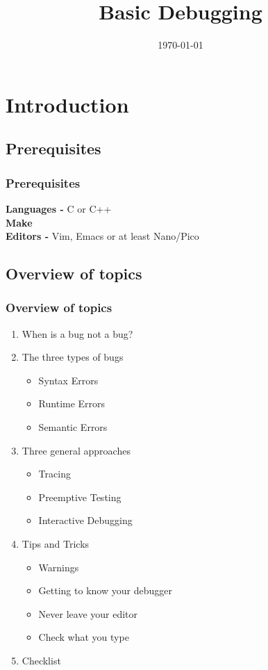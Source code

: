 \documentclass{beamer}
\title{Basic Debugging}
\date{\today}
\begin{document}
\frame{\titlepage}

\section{Introduction}
\subsection{Prerequisites}
\frame 
{
    \frametitle{Prerequisites}
    \textbf{Languages -} C or C++\\
    \textbf{Make} \\
    \textbf{Editors -} Vim, Emacs or at least Nano/Pico \\
}

\subsection{Overview of topics}
\frame
{
    \frametitle{Overview of topics}

    \begin{enumerate}
        \item When is a bug not a bug?
        \item The three types of bugs
            \begin{itemize}
                \item Syntax Errors
                \item Runtime Errors
                \item Semantic Errors
            \end{itemize}
        \item Three general approaches
            \begin{itemize}
                \item Tracing
                \item Preemptive Testing
                \item Interactive Debugging
            \end{itemize}
        \item Tips and Tricks
            \begin{itemize}
                \item Warnings
                \item Getting to know your debugger
                \item Never leave your editor
                \item Check what you type
            \end{itemize}
        \item Checklist

    \end{enumerate}
}
\end{document}

